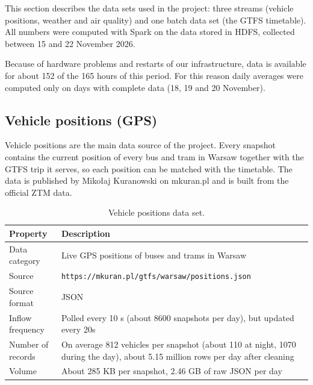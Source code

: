 \documentclass[11pt]{article}
\begin{document}
This section describes the data sets used in the project: three streams
(vehicle positions, weather and air quality) and one batch data set
(the GTFS timetable). All numbers were computed with Spark on the data
stored in HDFS, collected between 15 and 22 November 2026.

Because of hardware problems and restarts of our infrastructure, data is
available for about 152 of the 165 hours of this period. For this reason
daily averages were computed only on days with complete data
(18, 19 and 20 November).

\subsection{Vehicle positions (GPS)}

Vehicle positions are the main data source of the project.
Every snapshot contains the current position of every bus and tram in Warsaw together with the GTFS trip it serves,
so each position can be matched with the timetable.
The data is published by Mikołaj Kuranowski on mkuran.pl and is built from the official ZTM data.

\begin{table}[H]
\centering
\caption{Vehicle positions data set.}\label{tab:ds-gps}
\begin{tabular}{|>{\raggedright\arraybackslash}p{3cm}|>{\raggedright\arraybackslash}p{11cm}|}
\hline
\textbf{Property} & \textbf{Description} \\
\hline
Data category & Live GPS positions of buses and trams in Warsaw \\ \hline
Source & \texttt{https://mkuran.pl/gtfs/warsaw/positions.json} \\ \hline
Source format & JSON \\ \hline
Inflow frequency & Polled every 10 s (about 8600 snapshots per day), but updated every 20s \\ \hline
Number of records & On average 812 vehicles per snapshot (about 110 at night, 1070 during the day), about 5.15 million rows per day after cleaning \\ \hline
Volume & About 285 KB per snapshot, 2.46 GB of raw JSON per day \\ \hline
\end{tabular}
\end{table}
\end{document}

